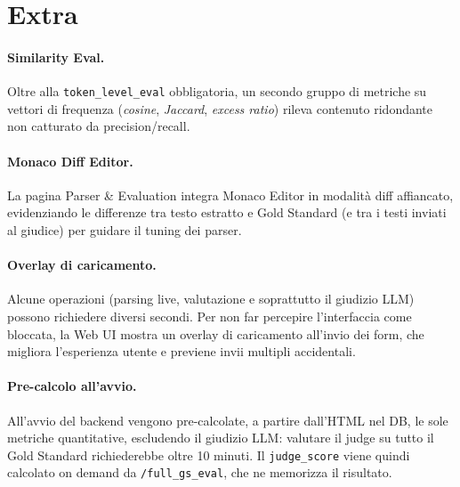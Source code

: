 \documentclass[11pt]{article}
\begin{document}

\section*{Extra}

\paragraph{Similarity Eval.} Oltre alla \texttt{token\_level\_eval} obbligatoria, un secondo gruppo di metriche su vettori di frequenza (\emph{cosine}, \emph{Jaccard}, \emph{excess ratio}) rileva contenuto ridondante non catturato da precision/recall.

\paragraph{Monaco Diff Editor.} La pagina Parser \& Evaluation integra Monaco Editor in modalità diff affiancato, evidenziando le differenze tra testo estratto e Gold Standard (e tra i testi inviati al giudice) per guidare il tuning dei parser.

\paragraph{Overlay di caricamento.} Alcune operazioni (parsing live, valutazione e soprattutto il giudizio LLM) possono richiedere diversi secondi. Per non far percepire l'interfaccia come bloccata, la Web UI mostra un overlay di caricamento all'invio dei form, che migliora l'esperienza utente e previene invii multipli accidentali.

\paragraph{Pre-calcolo all'avvio.} All'avvio del backend vengono pre-calcolate, a partire dall'HTML nel DB, le sole metriche quantitative, escludendo il giudizio LLM: valutare il judge su tutto il Gold Standard richiederebbe oltre 10 minuti. Il \texttt{judge\_score} viene quindi calcolato on demand da \texttt{/full\_gs\_eval}, che ne memorizza il risultato.
\end{document}
